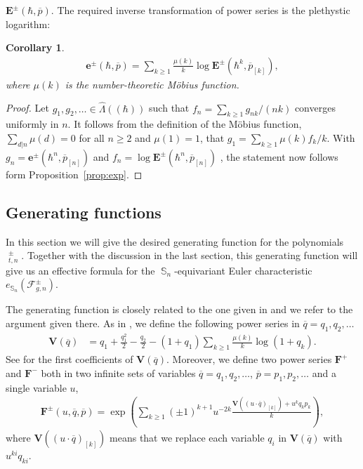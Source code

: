 \documentclass[oneside]{amsart}
\newtheorem{corollary}[theorem]{Corollary}
\theoremstyle{remark}
\newcommand{\bb}[1]{{\overline{#1}}}
\DeclareMathOperator{\SG}{{\mathbb S}}
\DeclareMathOperator{\ee}{\widehat{e}}
\newcommand{\F}{\mathcal{F}}
\begin{document}
$ \mathbf E^\pm(\hbar, \bb p) $.
The required inverse transformation of power series is the plethystic logarithm:
\begin{corollary}
\label{cor:log}
\begin{align*} \mathbf e^\pm(\hbar, \bb p) = \sum_{k \geq 1} \frac{\mu(k)}{k} \log \mathbf E^\pm(\hbar^k, \bb p_{[k]}), \end{align*}
where $\mu(k)$ is the number-theoretic M\"obius function.
\end{corollary}
\begin{proof}
Let $g_1,g_2,\ldots \in \widehat \Lambda((\hbar))$ such that  
$f_n = \sum_{k\geq 1} {g_{nk}}/{(nk)}$ converges uniformly in $n$.
It follows from the definition of the M\"obius function,
$\sum_{d|n} \mu(d) = 0$ for all $n \geq 2$ and $\mu(1)=1$,
that 
$g_1 = \sum_{k \geq 1} {\mu(k)} f_{k}/k$.
With 
$ g_n = \mathbf e^\pm(\hbar^n, \bb p_{[n]}) $
and $f_n = \log \mathbf E^\pm(\hbar^n, \bb p_{[n]})$
, the statement now follows form Proposition~\ref{prop:exp}.
\end{proof}

%
%
%
%

%
%
%

\subsection{Generating functions}
\label{sec:genfun}
In this section we will give the desired generating function for the 
polynomials $\ee_{t,n}^\pm$. Together with the discussion in the last section,
this generating function will give us an effective formula for the 
$\SG_n$-equivariant Euler characteristic $e_{\SG_n}(\F^\pm_{g,n})$.

The generating function is closely related to the one given in \cite[Theorem~3.12]{BV2} and we refer to the argument given there.
As in \cite{BV2}, we define the following power series in $\bb q = q_1,q_2,\ldots$
 \begin{align} \label{eq:V} {\mathbf V}(\bb q)&=q_1+\frac{q_1^2}{2}-\frac{q_2}{2}-(1+q_1)\sum_{k \geq 1} \frac{\mu(k)}{k} \log(1+q_k). \end{align}
See \cite{BV2} for the first coefficients of $\mathbf V(\bb q)$.
Moreover, we define two power series $\mathbf F^+$ and $\mathbf F^-$ 
both in two infinite sets of variables
$\bb q = q_1,q_2, \ldots$,
 $\bb p = p_1,p_2,\ldots$ and a single variable $u$, 
\begin{align} \label{eq:F} {\mathbf F^\pm}(u,\bb q,\bb p) =\exp \left(\sum_{k \geq 1} (\pm1)^{k+1} u^{-2k} \frac{{\mathbf V}( (u \cdot \bb q)_{[k]}) + u^k q_k p_k}{k}\right), \end{align}
where ${\mathbf V}((u \cdot \bb q)_{[k]})$ means that we replace each variable $q_i$ in ${\mathbf V}(\bb q)$ with $u^{ki} q_{ki}$.
\end{document}
